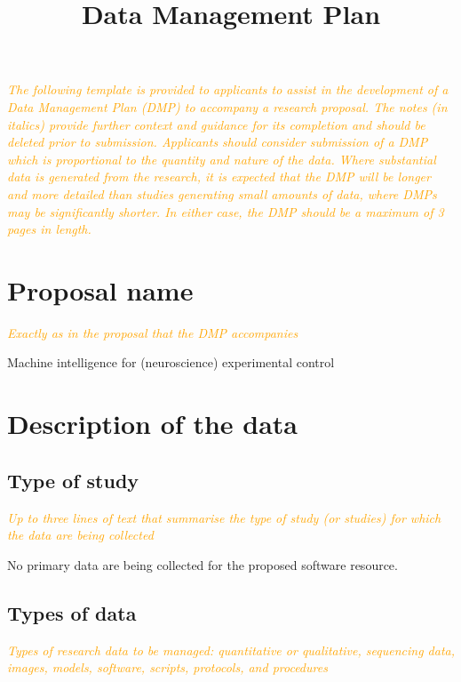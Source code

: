 \documentclass[a4paper,11pt]{article}
\title{Data Management Plan}
\author{}
\date{}
\begin{document}
\maketitle

\textcolor{orange}{\textit{The following template is provided to applicants to assist in the development of a Data Management Plan (DMP) to accompany a research proposal. The notes (in italics) provide further context and guidance for its completion and should be deleted prior to submission. Applicants should consider submission of a DMP which is proportional to the quantity and nature of the data. Where substantial data is generated from the research, it is expected that the DMP will be longer and more detailed than studies generating small amounts of data, where DMPs may be significantly shorter. In either case, the DMP should be a maximum of 3 pages in length.}}

\setcounter{section}{-1}

\section{Proposal name}

\textcolor{orange}{\textit{Exactly as in the proposal that the DMP accompanies}}

Machine intelligence for (neuroscience) experimental control

\section{Description of the data}
\subsection{Type of study}

\textcolor{orange}{\textit{Up to three lines of text that summarise the type of study (or studies) for which the data are being collected}}

No primary data are being collected for the proposed software resource.

\subsection{Types of data}

\textcolor{orange}{\textit{Types of research data to be managed: quantitative or
qualitative, sequencing data, images, models, software, scripts, protocols, and
procedures}}
\end{document}
